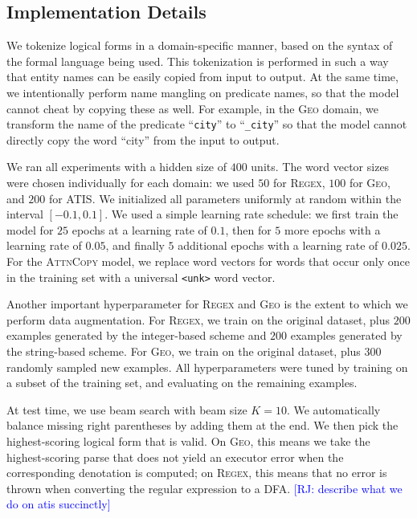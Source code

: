 \documentclass[11pt,letterpaper]{article}
\newcommand{\attncopy}{\textsc{AttnCopy}\xspace}
\newcommand{\atis}{\textsc{ATIS}\xspace}
\newcommand{\regex}{\textsc{Regex}\xspace}
\newcommand{\geo}{\textsc{Geo}\xspace}
\newcommand\rj[1]{\textcolor{blue}{[RJ: #1]}}
\begin{document}
\subsection{Implementation Details}
We tokenize logical forms in a domain-specific manner,
based on the syntax of the formal language being used.
This tokenization is performed in such a way that
entity names can be easily copied from input to output.
At the same time, we intentionally perform name mangling on predicate names,
so that the model cannot cheat by copying these as well.
For example, in the \geo domain, we transform the name
of the predicate ``\texttt{city}'' to ``\texttt{\_city}''
so that the model cannot directly copy the word ``city'' from the input 
to output.

We ran all experiments with a hidden size of $400$ units.
The word vector sizes were chosen individually for each domain:
we used $50$ for \regex, $100$ for \geo, and $200$ for \atis.
We initialized all parameters uniformly at random 
within the interval $[-0.1, 0.1]$.
We used a simple learning rate schedule:
we first train the model for $25$ epochs at a learning rate of $0.1$,
then for $5$ more epochs with a learning rate of $0.05$,
and finally $5$ additional epochs with a learning rate of $0.025$.
For the \attncopy model, we replace word vectors for words
that occur only once in the training set 
with a universal \texttt{<unk>} word vector.

Another important hyperparameter for \regex and \geo is the
extent to which we perform data augmentation.
For \regex, we train on the original dataset,
plus $200$ examples generated by the integer-based scheme
and $200$ examples generated by the string-based scheme.
For \geo, we train on the original dataset,
plus $300$ randomly sampled new examples.
All hyperparameters were tuned by training on a subset of the
training set, and evaluating on the remaining examples.

At test time, we use beam search with beam size $K=10$.
We automatically balance missing right parentheses
by adding them at the end.
We then pick the highest-scoring logical form that is valid.
On \geo, this means we take the highest-scoring parse
that does not yield an executor error when the
corresponding denotation is computed;
on \regex, this means that no error is thrown when 
converting the regular expression to a DFA.
\rj{describe what we do on atis succinctly}
\end{document}
